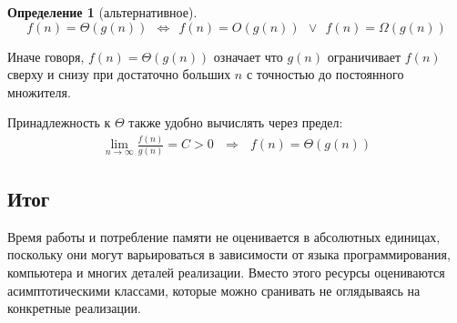 \documentclass[12pt,a4paper]{report}
\newtheorem*{definition}{Определение}
\begin{document}
\begin{definition}[альтернативное]
$$
  f(n) = \Theta(g(n)) ~~\Leftrightarrow~~  f(n) = O(g(n)) ~~\vee~~ f(n) = \Omega(g(n))
$$
\end{definition}

Иначе говоря, $f(n)=\Theta(g(n))$ означает что $g(n)$ ограничивает $f(n)$ сверху и снизу при достаточно больших $n$ с точностью до постоянного множителя.

Принадлежность к $\Theta$ также удобно вычислять через предел:
$$
\begin{gathered}
\lim_{n\to\infty} \frac{f(n)}{g(n)} = C > 0   ~~~\Rightarrow~~~   f(n) = \Theta(g(n))
\end{gathered}
$$

\subsection*{Итог}

Время работы и потребление памяти не оценивается в абсолютных единицах, поскольку они могут варьироваться в зависимости от языка программирования, компьютера и многих деталей реализации. Вместо этого ресурсы оцениваются асимптотическими классами, которые можно сранивать не оглядываясь на конкретные реализации.
\end{document}
